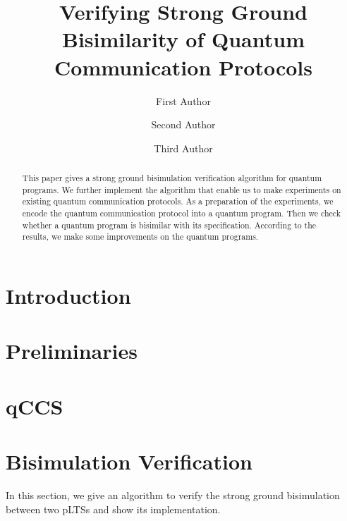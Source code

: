 \documentclass[runningheads]{llncs}
\begin{document}
\title{Verifying Strong Ground Bisimilarity of Quantum Communication Protocols}
\author{First Author \and
Second Author \and
Third Author}

\authorrunning{}


\maketitle

\begin{abstract}This paper gives a strong ground bisimulation verification algorithm for quantum programs. We further implement the algorithm that enable us to make experiments on existing quantum communication protocols. As a preparation of the experiments, we encode the quantum communication protocol into a quantum program. Then we check whether a quantum program is bisimilar with its specification. According to the results, we make some improvements on the quantum programs.

\end{abstract}

\section{Introduction}

\section{Preliminaries}

\section{qCCS}

\section{Bisimulation Verification}
In this section, we give an algorithm to verify the strong ground bisimulation between two pLTSs and show its implementation.
\end{document}
